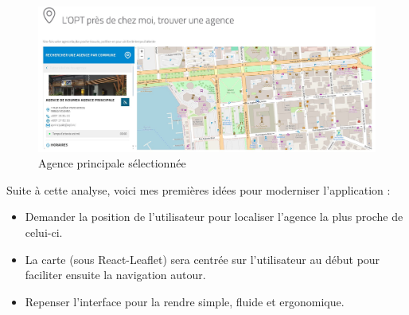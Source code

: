 \documentclass[12pt,a4paper]{report}
\begin{document}
\begin{figure}[h] %
    \centering
    \includegraphics[width=1\textwidth]{ressources_rapport/ancien_app_opt_noumea_agence_principale.JPG}
    \caption{Agence principale sélectionnée}
\end{figure}
\vspace{2cm}
Suite à cette analyse, voici mes premières idées pour moderniser l'application :
\begin{itemize}
    \item Demander la position de l'utilisateur pour localiser l'agence la plus proche de celui-ci.
    \item La carte (sous React-Leaflet) sera centrée sur l'utilisateur au début pour faciliter ensuite la navigation autour.
    \item Repenser l'interface pour la rendre simple, fluide et ergonomique.
\end{itemize}

\newpage
\end{document}
